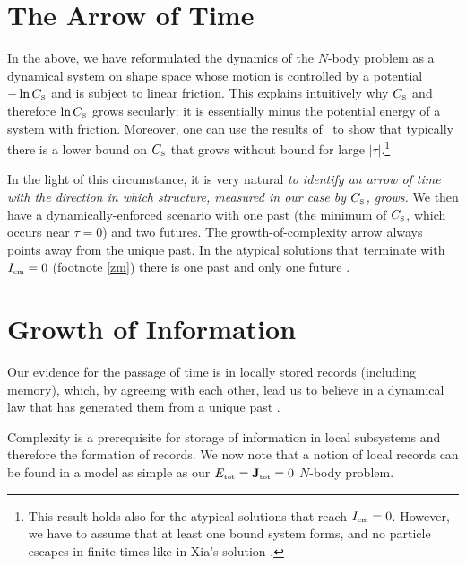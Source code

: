 \documentclass[prl,nofootinbib,twocolumn,superscriptaddress]{revtex4}
\newcommand{\st}[1]{\text{\tiny \rm #1}}
\begin{document}
\section{The Arrow of Time}

In the above, we have reformulated the dynamics of the $N$-body problem as
a dynamical system on shape space whose motion is controlled by a potential 
$- \ln C_\st{S}$ and is subject to linear friction. This explains intuitively why 
$C_\st{S}$ and therefore $\ln C_\st{S}$ grows secularly: it is essentially minus the potential energy of a system with friction. Moreover, one can use the results of~\cite{Marchial:1976fi}
to show that typically there is a lower bound on $C_\st{S}$ that grows without bound for large $|\tau|$.\footnote{This result holds also for the atypical solutions that reach $I_\st{cm}=0$. However, we have to assume that at least one bound system forms, and no particle escapes in finite times like in Xia's solution \cite{Xia1992}.}

In the light of this circumstance, it is very natural {\it to identify an arrow of time with the direction in which structure, measured in our case by $C_\st{S}$, grows.} We then have a dynamically-enforced scenario with one past (the minimum of $C_\st{S}$, which occurs near $\tau=0$) and two futures. The growth-of-complexity arrow always points away from the unique past. In the atypical solutions that terminate with $I_\st{cm}=0$ (footnote \ref{zm}) there is one past and only one future \cite{LongPaper}.

\section{Growth of Information}

Our evidence for the passage of time  is in locally stored records (including memory), which, by agreeing with each other, lead us to believe in a dynamical law that has generated them
from a unique past \cite{Barbour1999}.

Complexity is a prerequisite for storage of information
in local subsystems and therefore the formation of records. We now note that a notion of local records can be found in a model as simple as our $E_\st{tot} = {\bf J}_\st{tot} = 0$ $N$-body problem.
\end{document}
